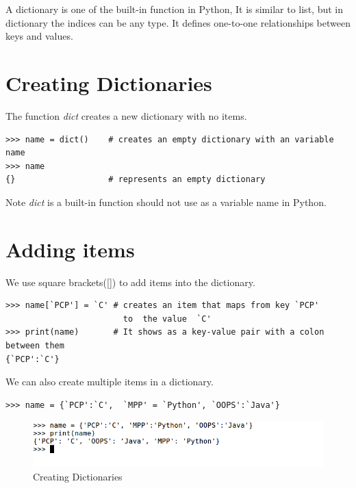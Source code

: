 \documentclass[11pt,a4paper]{article}
\author{TalentSprint}
\date{}
\begin{document}
A dictionary is one of the built-in function in Python, It is similar to list, but in dictionary the indices can be any type. It defines one-to-one relationships between keys and values.

\section*{Creating Dictionaries}
The function \emph{dict} creates a new dictionary with no items.
\begin{verbatim}
>>> name = dict()    # creates an empty dictionary with an variable name
>>> name
{}                   # represents an empty dictionary
\end{verbatim}
\begin{bclogo}[couleur=blue!5, arrondi=0.3, logo=\bctrombone]{Note}
\emph{dict} is a built-in function should not use as a variable name in Python.
\end{bclogo}

\section*{Adding items}
We use square brackets([]) to add items into the dictionary.
\begin{verbatim}
>>> name[`PCP'] = `C' # creates an item that maps from key `PCP'
                        to  the value  `C'
>>> print(name)       # It shows as a key-value pair with a colon between them
{`PCP':`C'}
\end{verbatim}
We can also create multiple items in a dictionary.
\begin{verbatim}
>>> name = {`PCP':`C', 	`MPP' = `Python', `OOPS':`Java'}
\end{verbatim}
\begin{figure}[ht]
\begin{center}
\includegraphics[scale=0.5]{Creating_Dictionaries.png}
\caption{Creating Dictionaries}
\label{Creating Dictionaries}
\end{center}
\end{figure}
\end{document}
